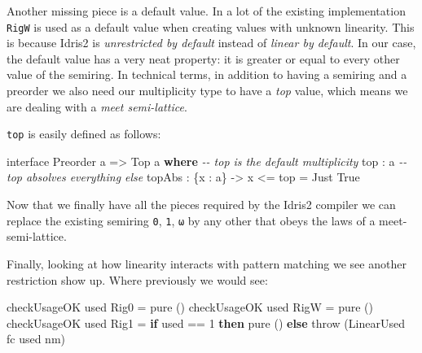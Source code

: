 \documentclass[
]{article}
\newenvironment{Shaded}{}{}
\newcommand{\CommentTok}[1]{\textcolor[rgb]{0.38,0.63,0.69}{\textit{#1}}}
\newcommand{\DataTypeTok}[1]{\textcolor[rgb]{0.56,0.13,0.00}{#1}}
\newcommand{\DecValTok}[1]{\textcolor[rgb]{0.25,0.63,0.44}{#1}}
\newcommand{\FunctionTok}[1]{\textcolor[rgb]{0.02,0.16,0.49}{#1}}
\newcommand{\KeywordTok}[1]{\textcolor[rgb]{0.00,0.44,0.13}{\textbf{#1}}}
\newcommand{\NormalTok}[1]{#1}
\newcommand{\OperatorTok}[1]{\textcolor[rgb]{0.40,0.40,0.40}{#1}}
\newcommand{\OtherTok}[1]{\textcolor[rgb]{0.00,0.44,0.13}{#1}}
\begin{document}
Another missing piece is a default value. In a lot of the existing
implementation \texttt{RigW} is used as a default value when creating
values with unknown linearity. This is because Idris2 is
\emph{unrestricted by default} instead of \emph{linear by default}. In
our case, the default value has a very neat property: it is greater or
equal to every other value of the semiring. In technical terms, in
addition to having a semiring and a preorder we also need our
multiplicity type to have a \emph{top} value, which means we are dealing
with a \emph{meet semi-lattice}.

\texttt{top} is easily defined as follows:

\begin{Shaded}
\begin{Highlighting}[]
\NormalTok{interface }\DataTypeTok{Preorder}\NormalTok{ a }\OtherTok{=\textgreater{}} \DataTypeTok{Top}\NormalTok{ a }\KeywordTok{where}
  \CommentTok{{-}{-} top is the default multiplicity}
\NormalTok{  top }\OperatorTok{:}\NormalTok{ a}
  \CommentTok{{-}{-} top absolves everything else}
\NormalTok{  topAbs }\OperatorTok{:}\NormalTok{ \{x }\OperatorTok{:}\NormalTok{ a\} }\OtherTok{{-}\textgreater{}}\NormalTok{ x }\OperatorTok{\textless{}=}\NormalTok{ top }\OtherTok{=} \DataTypeTok{Just} \DataTypeTok{True}
\end{Highlighting}
\end{Shaded}

Now that we finally have all the pieces required by the Idris2 compiler
we can replace the existing semiring \texttt{0}, \texttt{1}, \texttt{ω}
by any other that obeys the laws of a meet-semi-lattice.

Finally, looking at how linearity interacts with pattern matching we see
another restriction show up. Where previously we would see:

\begin{Shaded}
\begin{Highlighting}[]
\NormalTok{checkUsageOK used }\DataTypeTok{Rig0} \OtherTok{=} \FunctionTok{pure}\NormalTok{ ()}
\NormalTok{checkUsageOK used }\DataTypeTok{RigW} \OtherTok{=} \FunctionTok{pure}\NormalTok{ ()}
\NormalTok{checkUsageOK used }\DataTypeTok{Rig1}
         \OtherTok{=} \KeywordTok{if}\NormalTok{ used }\OperatorTok{==} \DecValTok{1}
              \KeywordTok{then} \FunctionTok{pure}\NormalTok{ ()}
              \KeywordTok{else}\NormalTok{ throw (}\DataTypeTok{LinearUsed}\NormalTok{ fc used nm)}
\end{Highlighting}
\end{Shaded}
\end{document}
